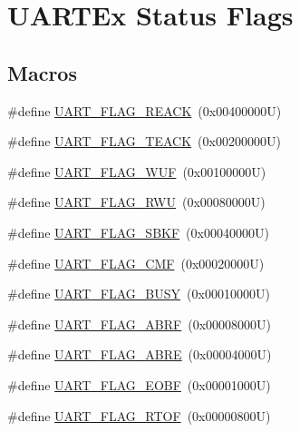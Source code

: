 \hypertarget{group___u_a_r_t___flags}{}\section{U\+A\+R\+T\+Ex Status Flags}
\label{group___u_a_r_t___flags}
\subsection*{Macros}
\begin{DoxyCompactItemize}
\item 
\#define \hyperlink{group___u_a_r_t___flags_ga18f2d6a153838d8fd53911352a4d87ad}{U\+A\+R\+T\+\_\+\+F\+L\+A\+G\+\_\+\+R\+E\+A\+CK}~(0x00400000\+U)
\item 
\#define \hyperlink{group___u_a_r_t___flags_gaf4a4ade6fd987ea7f22786269317f94a}{U\+A\+R\+T\+\_\+\+F\+L\+A\+G\+\_\+\+T\+E\+A\+CK}~(0x00200000\+U)
\item 
\#define \hyperlink{group___u_a_r_t___flags_gada80ee73404da204801766e42cbf7163}{U\+A\+R\+T\+\_\+\+F\+L\+A\+G\+\_\+\+W\+UF}~(0x00100000\+U)
\item 
\#define \hyperlink{group___u_a_r_t___flags_ga5d5f6f91093bfb222baa277a86f6b75b}{U\+A\+R\+T\+\_\+\+F\+L\+A\+G\+\_\+\+R\+WU}~(0x00080000\+U)
\item 
\#define \hyperlink{group___u_a_r_t___flags_gaea7a67e1f6a8af78e2adfaed59d1a4be}{U\+A\+R\+T\+\_\+\+F\+L\+A\+G\+\_\+\+S\+B\+KF}~(0x00040000\+U)
\item 
\#define \hyperlink{group___u_a_r_t___flags_ga01f2c67d8999a9ee8d91ac3cb5e7fbfe}{U\+A\+R\+T\+\_\+\+F\+L\+A\+G\+\_\+\+C\+MF}~(0x00020000\+U)
\item 
\#define \hyperlink{group___u_a_r_t___flags_ga2d1387d412382a345097acb403748ba3}{U\+A\+R\+T\+\_\+\+F\+L\+A\+G\+\_\+\+B\+U\+SY}~(0x00010000\+U)
\item 
\#define \hyperlink{group___u_a_r_t___flags_ga9e309874f2c8f71e4049ae6cb702a2eb}{U\+A\+R\+T\+\_\+\+F\+L\+A\+G\+\_\+\+A\+B\+RF}~(0x00008000\+U)
\item 
\#define \hyperlink{group___u_a_r_t___flags_ga87853efaab808377c8acb9e8b671a2e8}{U\+A\+R\+T\+\_\+\+F\+L\+A\+G\+\_\+\+A\+B\+RE}~(0x00004000\+U)
\item 
\#define \hyperlink{group___u_a_r_t___flags_ga9578373b2ce868613c5138762dbd2fdd}{U\+A\+R\+T\+\_\+\+F\+L\+A\+G\+\_\+\+E\+O\+BF}~(0x00001000\+U)
\item 
\#define \hyperlink{group___u_a_r_t___flags_ga69afec3b174a6b5969e71ea25d973958}{U\+A\+R\+T\+\_\+\+F\+L\+A\+G\+\_\+\+R\+T\+OF}~(0x00000800\+U)

\end{DoxyCompactItemize}
